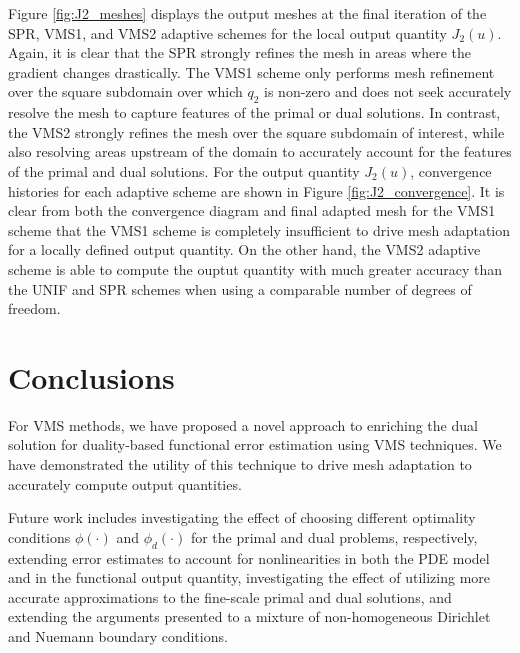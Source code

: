 Figure \ref{fig:J2_meshes} displays the output meshes at
the final iteration of the \textsc{SPR}, \textsc{VMS1},
and \textsc{VMS2} adaptive schemes for the local
output quantity $J_2(u)$. Again, it is clear that the
\textsc{SPR} strongly refines the mesh in areas where the
gradient changes drastically. The \textsc{VMS1} scheme
only performs mesh refinement over the square subdomain
over which $q_2$ is non-zero and does not seek
accurately resolve the mesh to capture features of
the primal or dual solutions. In contrast, the
\textsc{VMS2} strongly refines the mesh over the
square subdomain of interest, while also resolving
areas upstream of the domain to accurately account
for the features of the primal and dual solutions.
For the output quantity $J_2(u)$, convergence histories
for each adaptive scheme are shown in Figure
\ref{fig:J2_convergence}. It is clear from both
the convergence diagram and final adapted mesh
for the \textsc{VMS1} scheme that the \textsc{VMS1}
scheme is completely insufficient to drive mesh
adaptation for a locally defined output quantity.
On the other hand, the \textsc{VMS2} adaptive scheme
is able to compute the ouptut quantity with much
greater accuracy than the \textsc{UNIF} and
\textsc{SPR} schemes when using a comparable number
of degrees of freedom.

\section{Conclusions}

For VMS methods, we have proposed a novel approach
to enriching the dual solution for duality-based
functional error estimation using VMS techniques.
We have demonstrated the utility of this technique
to drive mesh adaptation to accurately compute
output quantities.

Future work includes investigating the effect
of choosing different optimality conditions
$\phi(\cdot)$ and $\phi_d(\cdot)$ for the primal
and dual problems, respectively, extending
error estimates to account for nonlinearities
in both the PDE model and in the functional output
quantity, investigating the effect of
utilizing more accurate approximations to the
fine-scale primal and dual solutions, and
extending the arguments presented to
a mixture of non-homogeneous Dirichlet
and Nuemann boundary conditions.



